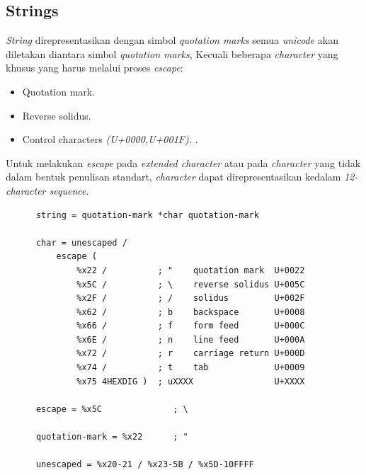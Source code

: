 \subsection{Strings}
\textit{String} direpresentasikan dengan simbol \textit{quotation marks} semua \textit{unicode} akan diletakan diantara simbol \textit{quotation marks}, Kecuali beberapa \textit{character} yang khusus yang harus melalui proses \textit{escape}:
\begin{itemize}
    \item Quotation mark.
    \item Reverse solidus.
    \item Control characters \textit{(U+0000,U+001F).} .
\end{itemize}
Untuk melakukan \textit{escape} pada \textit{extended character} atau pada \textit{character} yang tidak dalam bentuk penulisan standart, \textit{character} dapat direpresentasikan kedalam \textit{12-character sequence}.

\begin{lstlisting}
      string = quotation-mark *char quotation-mark

      char = unescaped /
          escape (
              %x22 /          ; "    quotation mark  U+0022
              %x5C /          ; \    reverse solidus U+005C
              %x2F /          ; /    solidus         U+002F
              %x62 /          ; b    backspace       U+0008
              %x66 /          ; f    form feed       U+000C
              %x6E /          ; n    line feed       U+000A
              %x72 /          ; r    carriage return U+000D
              %x74 /          ; t    tab             U+0009
              %x75 4HEXDIG )  ; uXXXX                U+XXXX

      escape = %x5C              ; \

      quotation-mark = %x22      ; "

      unescaped = %x20-21 / %x23-5B / %x5D-10FFFF
\end{lstlisting}

